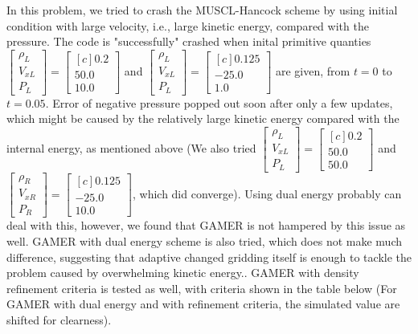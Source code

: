 \documentclass[a4paper,10pt]{article}
\begin{document}
In this problem, we tried to crash the MUSCL-Hancock scheme by using initial condition with large velocity, i.e., large kinetic energy, compared with the pressure. The code is "successfully" crashed when inital primitive quanties $\begin{bmatrix*}\rho_L\\V_{xL}\\P_L\end{bmatrix*}=\begin{bmatrix*}[c]0.2\\50.0\\10.0 \end{bmatrix*}$ and $\begin{bmatrix*}\rho_L\\V_{xL}\\P_L\end{bmatrix*}=\begin{bmatrix*}[c]0.125\\-25.0\\1.0\end{bmatrix*}$ are given, from $t=0$ to $t=0.05$. Error of negative pressure popped out soon after only a few updates, which might be caused by the relatively large kinetic energy compared with the internal energy, as mentioned above (We also tried $\begin{bmatrix*}\rho_L\\V_{xL}\\P_L\end{bmatrix*}=\begin{bmatrix*}[c]0.2\\50.0\\50.0 \end{bmatrix*}$ and $\begin{bmatrix*}\rho_R\\V_{xR}\\P_R\end{bmatrix*}=\begin{bmatrix*}[c]0.125\\-25.0\\10.0\end{bmatrix*}$, which did converge). Using dual energy probably can deal with this, however, we found that GAMER is not hampered by this issue as well. GAMER with dual energy scheme is also tried, which does not make much difference, suggesting that adaptive changed gridding itself is enough to tackle the problem caused by overwhelming kinetic energy.. GAMER with density refinement criteria is tested as well, with criteria shown in the table below (For GAMER with dual energy and with refinement criteria, the simulated value are shifted for clearness). 
\end{document}
